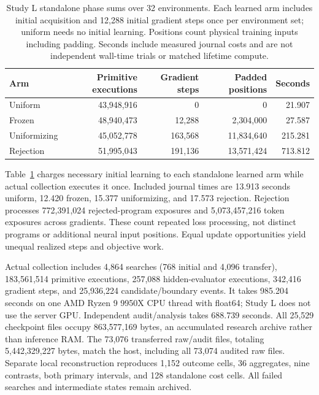 \documentclass[11pt]{article}
\begin{document}
\begin{table}[ht]
\centering\small
\begin{tabular}{lrrrr}
\toprule
Arm & Primitive executions & Gradient steps & Padded positions & Seconds \\
\midrule
Uniform & 43,948,916 & 0 & 0 & 21.907 \\
Frozen & 48,940,473 & 12,288 & 2,304,000 & 27.587 \\
Uniformizing & 45,052,778 & 163,568 & 11,834,640 & 215.281 \\
Rejection & 51,995,043 & 191,136 & 13,571,424 & 713.812 \\
\bottomrule
\end{tabular}
\caption{Study L standalone phase sums over 32 environments. Each learned arm
 includes initial acquisition and 12,288 initial gradient steps once per
 environment set; uniform needs no initial learning. Positions count physical
 training inputs including padding. Seconds include measured journal costs
 and are not independent wall-time trials or matched lifetime compute.}
\label{tab:l-costs}
\end{table}

Table~\ref{tab:l-costs} charges necessary initial learning to each standalone
learned arm while actual collection executes it once. Included journal times
are 13.913 seconds uniform, 12.420 frozen, 15.377 uniformizing, and 17.573
rejection. Rejection processes 772,391,024 rejected-program exposures and
5,073,457,216 token exposures across gradients. These count repeated loss
processing, not distinct programs or additional neural input positions.
Equal update opportunities yield unequal realized steps and objective work.

Actual collection includes 4,864 searches (768 initial and 4,096 transfer),
183,561,514 primitive executions, 257,088 hidden-evaluator executions,
342,416 gradient steps, and 25,936,224 candidate/boundary events. It takes
985.204 seconds on one AMD Ryzen 9 9950X CPU thread with float64; Study L does
not use the server GPU. Independent audit/analysis takes 688.739 seconds.
All 25,529 checkpoint files occupy 863,577,169 bytes, an accumulated research
archive rather than inference RAM. The 73,076 transferred raw/audit files,
totaling 5,442,329,227 bytes, match the host, including all 73,074 audited raw
files. Separate local reconstruction reproduces 1,152 outcome cells,
36 aggregates, nine contrasts, both primary intervals, and 128 standalone
cost cells. All failed searches and intermediate states remain archived.
\end{document}
